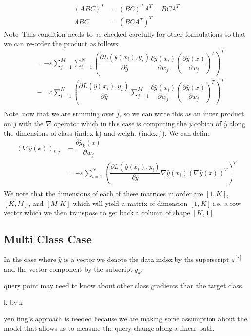 \begin{align}
    (ABC)^T &= (BC)^TA^T = BCA^T\\
    ABC &= (BCA^T)^T
\end{align}
Note: This condition needs to be checked carefully for other formulations so that we can re-order the product as follows:
\begin{align}
        &= -\varepsilon \sum_{j=1}^M  \sum_{i=1}^N \left(\dfrac{\partial L(\hat y(x_i), y_i)}{\partial \hat y} 
        \dfrac{\partial \hat y(x_i)}{\partial w_j} \left(\dfrac{\partial \hat y(x)}{\partial  w_j}\right)^T\right)^T
        \\
    &= -\varepsilon \sum_{i=1}^N \left(\dfrac{\partial L(\hat y(x_i), y_i)}{\partial \hat y} 
    \sum_{j=1}^M \dfrac{\partial \hat y(x_i)}{\partial w_j} \left(\dfrac{\partial \hat y(x)}{\partial w_j}\right)^T\right)^T\\        
\end{align}
Note, now that we are summing over $j$, so we can write this as an inner product on $j$ with the $\nabla$ operator which in this case is computing the jacobian of $\hat y$ along the dimensions of class (index k) and weight (index j). We can define 
\begin{align}
    (\nabla \hat y(x))_{k,j} &= \dfrac{\partial \hat y_{k}(x)}{\partial w_j}\\
    &= -\varepsilon \sum_{i=1}^N \left(\dfrac{\partial L(\hat y(x_i), y_i)}{\partial \hat y} 
     \nabla \hat y(x_i) (\nabla \hat y(x))^T\right)^T\\    
\end{align}
We note that the dimensions of each of these matrices in order are $[1,K]$, $[K,M]$, and $[M,K]$ which will yield a matrix of dimension $[1, K]$ i.e. a row vector which we then transpose to get back a column of shape $[K, 1]$

\subsection{Multi Class Case}


In the case where $\hat y$ is a vector we denote the data index by the superscript $y^{[i]}$ and the vector component by the subscript $y_k$.

query point may need to know about other class gradients than the target class. 

k by k

yen ting's approach is needed because we are making some assumption about the model that allows us to measure the query change along a linear path. 

